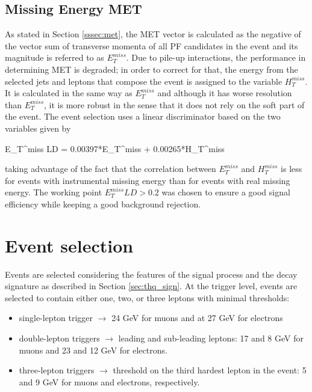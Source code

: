 
\subsection{Missing Energy MET}

As stated in Section \ref{sssec:met}, the MET vector is calculated as the negative of the vector sum of transverse momenta of all PF candidates in the event and its magnitude is referred to as $E_T^{miss}$. Due to pile-up interactions, the performance in determining MET is degraded; in order to correct for that, the energy from the selected jets and leptons that compose the event is assigned to the variable $H_T^{miss}$. It is calculated in the same way as  $E_T^{miss}$ and although it has worse resolution than $E_T^{miss}$, it is more robust in the sense that it does not rely on the soft part of the event. The event selection uses a linear discriminator based on the two variables given by 

\beqn
E_T^{miss} LD = 0.00397*E_T^{miss} + 0.00265*H_T^{miss}
\eeqn

\noindent taking advantage of the fact that the correlation between $E_T^{miss}$ and  $H_T^{miss}$ is less for events with instrumental missing energy than for events with real missing energy. The working point $E_T^{miss} LD > 0.2$ was chosen to ensure a good signal efficiency while keeping a good background rejection.

\section{Event selection}

Events are selected considering the features of the signal process and the decay signature as described in Section \ref{sec:thq_sign}. At the trigger level, events are selected to contain either one, two, or three leptons with minimal \pt thresholds:
\begin{itemize}
\item single-lepton trigger $\to$ 24 GeV for muons and at 27 GeV for electrons
\item double-lepton triggers $\to$ leading and sub-leading leptons: 17 and 8 GeV for muons and 23 and 12 GeV for electrons.
\item three-lepton triggers $\to$ threshold on the third hardest lepton in the event: 5 and 9 GeV for muons and electrons, respectively.
\end{itemize}

